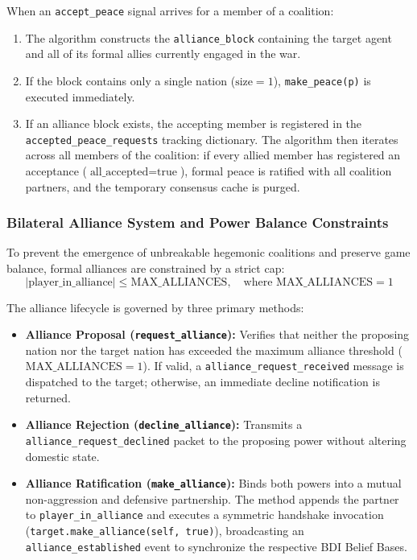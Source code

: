 When an \texttt{accept\_peace} signal arrives for a member of a coalition:
\begin{enumerate}
    \item The algorithm constructs the \texttt{alliance\_block} containing the target agent and all of its formal allies currently engaged in the war.
    \item If the block contains only a single nation ($\text{size} = 1$), \texttt{make\_peace(p)} is executed immediately.
    \item If an alliance block exists, the accepting member is registered in the \texttt{accepted\_peace\_requests} tracking dictionary. The algorithm then iterates across all members of the coalition: if every allied member has registered an acceptance ($\text{all\_accepted} = \text{true}$), formal peace is ratified with all coalition partners, and the temporary consensus cache is purged.
\end{enumerate}

\subsubsection{Bilateral Alliance System and Power Balance Constraints}
To prevent the emergence of unbreakable hegemonic coalitions and preserve game balance, formal alliances are constrained by a strict cap:
\begin{equation}
    |\text{player\_in\_alliance}| \le \text{MAX\_ALLIANCES}, \quad \text{where } \text{MAX\_ALLIANCES} = 1
\end{equation}

The alliance lifecycle is governed by three primary methods:
\begin{itemize}
    \item \textbf{Alliance Proposal (\texttt{request\_alliance}):} Verifies that neither the proposing nation nor the target nation has exceeded the maximum alliance threshold ($\text{MAX\_ALLIANCES} = 1$). If valid, a \texttt{alliance\_request\_received} message is dispatched to the target; otherwise, an immediate decline notification is returned.
    \item \textbf{Alliance Rejection (\texttt{decline\_alliance}):} Transmits a \texttt{alliance\_request\_declined} packet to the proposing power without altering domestic state.
    \item \textbf{Alliance Ratification (\texttt{make\_alliance}):} Binds both powers into a mutual non-aggression and defensive partnership. The method appends the partner to \texttt{player\_in\_alliance} and executes a symmetric handshake invocation (\texttt{target.make\_alliance(self, true)}), broadcasting an \texttt{alliance\_established} event to synchronize the respective BDI Belief Bases.
\end{itemize}


